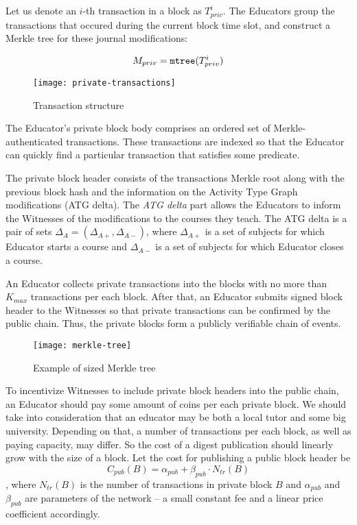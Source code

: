 Let us denote an $i$-th transaction in a block as $T_{priv}^i$. The Educators
group the transactions that occured during the current block time slot, and
construct a Merkle tree \cite{merkle1989certified} for these journal
modifications:

\begin{equation}
M_{priv} = \mathtt{mtree}(T_{priv}^i)
\end{equation}

\begin{figure}[ht]
\centering
\texttt{[image: private-transactions]}
\caption{Transaction structure}
\label{fig:private-transactions}
\end{figure}

The Educator's private block body comprises an ordered set of
Merkle-authenticated transactions. These transactions are indexed so that the
Educator can quickly find a particular transaction that satisfies some
predicate.

The private block header consists of the transactions Merkle root along with the
previous block hash and the information on the Activity Type Graph modifications
(ATG delta). The \textit{ATG delta} part allows the Educators to inform the
Witnesses of the modifications to the courses they teach. The ATG delta is a
pair of sets $\Delta_A = (\Delta_{A+}, \Delta_{A-})$, where $\Delta_{A+}$ is a
set of subjects for which Educator starts a course and $\Delta_{A-}$ is a set of
subjects for which Educator closes a course.

An Educator collects private transactions into the blocks with no more than $K_{max}$
transactions per each block. After that, an Educator submits signed block header
to the Witnesses so that private transactions can be confirmed by the public
chain. Thus, the private blocks form a publicly verifiable chain of events.

\begin{figure}[ht]
\centering
\texttt{[image: merkle-tree]}
\caption{Example of sized Merkle tree}
\label{fig:merkle-tree}
\end{figure}

To incentivize Witnesses to include private block headers into the public chain,
an Educator should pay some amount of coins per each private block. We should
take into consideration that an educator may be both a local tutor and some big
university. Depending on that, a number of transactions per each block, as well
as paying capacity, may differ. So the cost of a digest publication should
linearly grow with the size of a block. Let the cost for publishing a
public block header be
\begin{equation}\label{sec:priv-chain:pub-cost-eq}
  C_{pub}(B) = \alpha_{pub} + \beta_{pub} \cdot N_{tr}(B)
\end{equation}
, where $N_{tr}(B)$ is the number of transactions in private block $B$ and
$\alpha_{pub}$ and $\beta_{pub}$ are parameters of the network -- a small
constant fee and a linear price coefficient accordingly.

